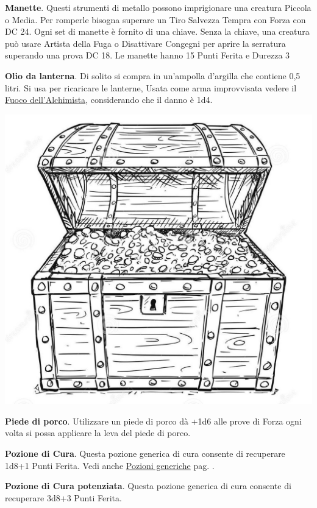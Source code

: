 \begin{multicols}{2}
\textbf{Manette}\label{Manette}\hypertarget{Manette}{}. Questi strumenti di metallo possono imprigionare una creatura Piccola o Media. Per romperle bisogna superare un Tiro Salvezza Tempra con Forza con DC 24. Ogni set di manette è fornito di una chiave. Senza la chiave, una creatura può usare Artista della Fuga o Disattivare Congegni per aprire la serratura superando una prova DC 18. Le manette hanno 15 Punti Ferita e Durezza 3

\textbf{Olio da lanterna}\hypertarget{Olio da lanterna}{}. Di solito si compra in un'ampolla d'argilla che contiene 0,5 litri. Si usa per ricaricare le lanterne, Usata come arma improvvisata vedere il \hyperlink{Fuoco dell'Alchimista}{Fuoco dell'Alchimista}, considerando che il danno è 1d4.

\begin{center}
	\includegraphics[width=0.7\linewidth]{immagini/forziere.png}
\end{center}

\textbf{Piede di porco}. Utilizzare un piede di porco dà +1d6 alle prove di Forza ogni volta si possa applicare la leva del piede di porco.\hypertarget{piedediporco}{}\label{piedediporco}

\textbf{Pozione di Cura}\hypertarget{Equip Pozione di Cura}{}. Questa pozione generica di cura consente di recuperare 1d8+1 Punti Ferita. Vedi anche \hyperlink{pozionigeneriche}{Pozioni generiche} pag. \pageref{pozionigeneriche}.

\textbf{Pozione di Cura potenziata}\label{Pozione di Cura potenziata}\hypertarget{Equip Pozione di Cura potenziata}{}. Questa pozione generica di cura consente di recuperare 3d8+3 Punti Ferita.


\end{multicols}
